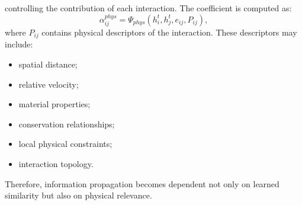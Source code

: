 controlling the contribution of each interaction. The coefficient is computed as: \begin{equation} \alpha_{ij}^{phys} = \Psi_{phys} ( h_i^t, h_j^t, e_{ij}, P_{ij} ), \end{equation} where $P_{ij}$ contains physical descriptors of the interaction. These descriptors may include: \begin{itemize} \item spatial distance; \item relative velocity; \item material properties; \item conservation relationships; \item local physical constraints; \item interaction topology. \end{itemize} Therefore, information propagation becomes dependent not only on learned similarity but also on physical relevance. %
